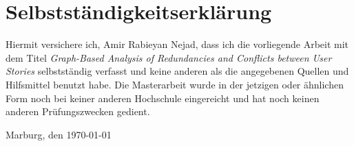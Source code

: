 \section*{Selbstständigkeitserklärung}
Hiermit versichere ich, Amir Rabieyan Nejad, dass ich die vorliegende Arbeit mit dem Titel \emph{Graph-Based Analysis of Redundancies and Conflicts between User Stories} selbstständig verfasst und keine anderen als die angegebenen Quellen und Hilfsmittel benutzt habe. Die Masterarbeit wurde in der jetzigen oder ähnlichen Form noch bei keiner anderen Hochschule eingereicht und hat noch keinen anderen Prüfungszwecken gedient.

\begin{flushleft}
\vspace{2cm}
Marburg, den \today
{}
\end{flushleft}






